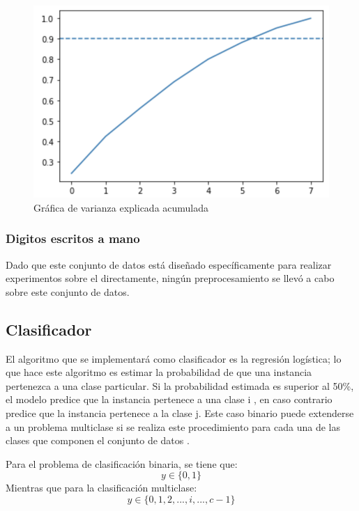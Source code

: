 \documentclass[runningheads]{llncs}
\begin{document}
\begin{figure}[h]
    \centering
    \includegraphics[scale=0.6]{img/cumulativeVariance.png}
    \caption{Gráfica de varianza explicada acumulada}
    \label{fig:cumulativeVariance}
\end{figure}

\subsubsection{Digitos escritos a mano}
Dado que este conjunto de datos está diseñado específicamente para realizar experimentos sobre el directamente, ningún preprocesamiento se llevó a cabo sobre este conjunto de datos. 

\subsection{Clasificador}
El algoritmo que se implementará como clasificador es la regresión logística; lo que hace este algoritmo es estimar la probabilidad de que una instancia pertenezca a una clase particular. Si la probabilidad estimada es superior al 50\%, el modelo predice que la instancia pertenece a una clase i , en caso contrario predice que la instancia pertenece a la clase j. Este caso binario puede extenderse a un problema multiclase si se realiza este procedimiento para cada una de las clases que componen el conjunto de datos \cite{handsonML}.

Para el problema de clasificación binaria, se tiene que:
\begin{equation}
    y \in \{0,1\}
\end{equation}
Mientras que para la clasificación multiclase:
\begin{equation}
    y \in \{0,1,2,..., i, ..., c - 1\}
    \label{eqn:multiclase}
\end{equation}
\end{document}
